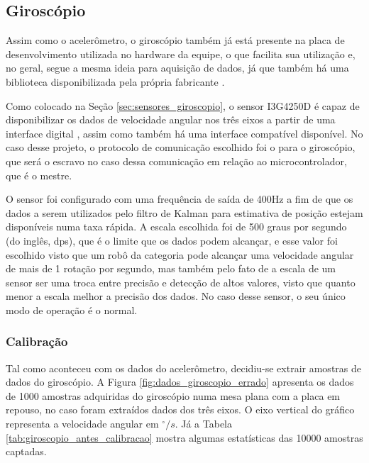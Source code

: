 \documentclass[acronym, symbols, table]{fei}
\begin{document}
	\subsection{Giroscópio}
	
	Assim como o acelerômetro, o giroscópio também já está presente na placa de desenvolvimento utilizada no hardware da equipe, o que facilita sua utilização e, no geral, segue a mesma ideia para aquisição de dados, já que também há uma biblioteca disponibilizada pela própria fabricante \cite{gyro_repository}.
	
	Como colocado na Seção \ref{sec:sensores_giroscopio}, o sensor I3G4250D é capaz de disponibilizar os dados de velocidade angular nos três eixos a partir de uma interface digital , assim como também há uma interface  compatível disponível. No caso desse projeto, o protocolo de comunicação escolhido foi o  para o giroscópio, que será o escravo no caso dessa comunicação em relação ao microcontrolador, que é o mestre.
	
	O sensor foi configurado com uma frequência de saída de 400Hz a fim de que os dados a serem utilizados pelo filtro de Kalman para estimativa de posição estejam disponíveis numa taxa rápida. A escala escolhida foi de 500 graus por segundo (do inglês, dps), que é o limite que os dados podem alcançar, e esse valor foi escolhido visto que um robô da categoria  pode alcançar uma velocidade angular de mais de 1 rotação por segundo, mas também pelo fato de a escala de um sensor ser uma troca entre precisão e detecção de altos valores, visto que quanto menor a escala melhor a precisão dos dados. No caso desse sensor, o seu único modo de operação é o normal.
	
	\subsubsection{Calibração}
	
	Tal como aconteceu com os dados do acelerômetro, decidiu-se extrair amostras de dados do giroscópio. A Figura \ref{fig:dados_giroscopio_errado} apresenta os dados de 1000 amostras adquiridas do giroscópio numa mesa plana com a placa em repouso, no caso foram extraídos dados dos três eixos. O eixo vertical do gráfico representa a velocidade angular em $^\circ/s$. Já a Tabela \ref{tab:giroscopio_antes_calibracao} mostra algumas estatísticas das 10000 amostras captadas.
	
\end{document}
